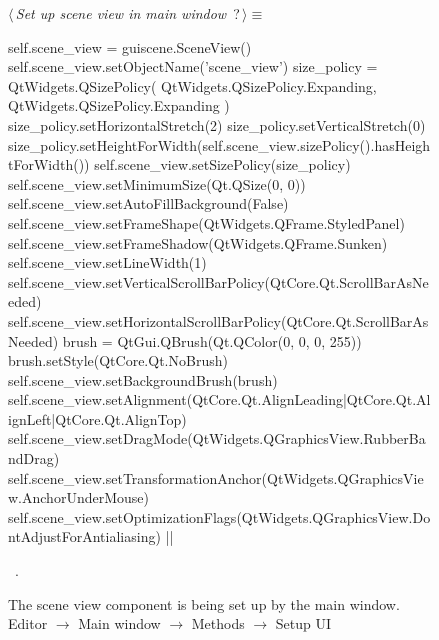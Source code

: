\documentclass[%
    a4paper,    %
    justified,  %
    nobib,      %
    openany     %
]{tufte-book}
\begin{document}
\begin{figure}
\begin{flushleft} \small
\begin{minipage}{\linewidth}\label{scrap83}\raggedright\small
{} $\langle\,${\itshape Set up scene view in main window}\nobreak\ {\footnotesize {?}}$\,\rangle\equiv$
\vspace{-1ex}
\begin{pythoncode}
self.scene_view = guiscene.SceneView()
self.scene_view.setObjectName('scene_view')
size_policy = QtWidgets.QSizePolicy(
    QtWidgets.QSizePolicy.Expanding,
    QtWidgets.QSizePolicy.Expanding
)
size_policy.setHorizontalStretch(2)
size_policy.setVerticalStretch(0)
size_policy.setHeightForWidth(self.scene_view.sizePolicy().hasHeightForWidth())
self.scene_view.setSizePolicy(size_policy)
self.scene_view.setMinimumSize(Qt.QSize(0, 0))
self.scene_view.setAutoFillBackground(False)
self.scene_view.setFrameShape(QtWidgets.QFrame.StyledPanel)
self.scene_view.setFrameShadow(QtWidgets.QFrame.Sunken)
self.scene_view.setLineWidth(1)
self.scene_view.setVerticalScrollBarPolicy(QtCore.Qt.ScrollBarAsNeeded)
self.scene_view.setHorizontalScrollBarPolicy(QtCore.Qt.ScrollBarAsNeeded)
brush = QtGui.QBrush(Qt.QColor(0, 0, 0, 255))
brush.setStyle(QtCore.Qt.NoBrush)
self.scene_view.setBackgroundBrush(brush)
self.scene_view.setAlignment(QtCore.Qt.AlignLeading|QtCore.Qt.AlignLeft|QtCore.Qt.AlignTop)
self.scene_view.setDragMode(QtWidgets.QGraphicsView.RubberBandDrag)
self.scene_view.setTransformationAnchor(QtWidgets.QGraphicsView.AnchorUnderMouse)
self.scene_view.setOptimizationFlags(QtWidgets.QGraphicsView.DontAdjustForAntialiasing)
|\NWsep|
\end{pythoncode}
\vspace{1.5ex}
\footnotesize
\begin{list}{}{\setlength{\itemsep}{-\parsep}\setlength{\itemindent}{-\leftmargin}}
\item \NWtxtMacroRefIn\ .

\item{}
\end{list}
\end{minipage}\vspace{4ex}
\end{flushleft}
\caption{The scene view component is being set up by the main window.
  \newline{}\newline{}Editor $\rightarrow$ Main window $\rightarrow$
  Methods $\rightarrow$ Setup UI}
\label{editor:lst:main-window:methods:setup-ui:setup-scene-view}
\end{figure}
\end{document}
